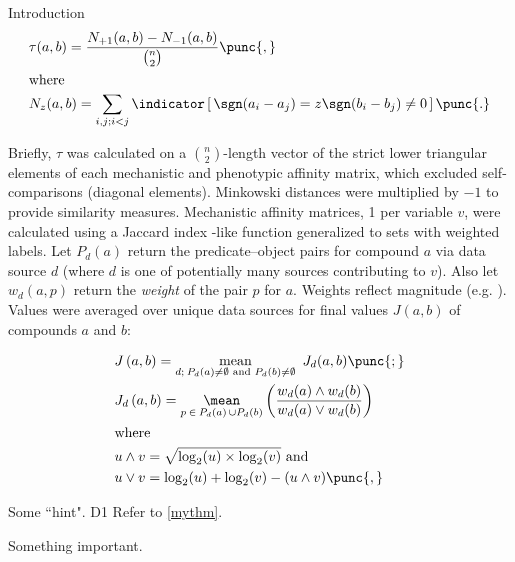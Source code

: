 \begin{MainChapter}{Introduction}
\begin{align}
    & \tau(a, b) = \frac{ N_{+1}(a,b) - N_{-1}(a,b)}{\textstyle \binom{n}{2}}
    \label{eqn:kappa}\punc{,}\\
    \shortintertext{where}
    & N_z(a,b) = \sum_{i,j;i<j}\indicator \left[ \, \sgn(a_i - a_j) = z \sgn(b_i - b_j) \neq 0 \, \right]
    \punc{.}
\end{align}

Briefly, $\tau$ was calculated on a $\binom{n}{2}$-length vector of the strict lower triangular elements of each mechanistic and phenotypic affinity matrix, which excluded self-comparisons (diagonal elements).
Minkowski distances were multiplied by $-1$ to provide similarity measures. Mechanistic affinity matrices, 1 per variable $v$, were calculated using a Jaccard index -like function generalized to sets with weighted labels.
Let $P_d(a)$ return the predicate--object pairs for compound $a$ via data source $d$ (where $d$ is one of potentially many sources contributing to $v$). Also let $w_d(a, p)$ return the \emph{weight} of the pair $p$ for $a$. Weights reflect magnitude (e.g. ).
Values were averaged over unique data sources for final values ${J}(a, b)$ of compounds $a$ and $b$:

\begin{align}
    &
    {J} \left( a, b \right) =
    \underset{
        d ; \: P_d(a) \neq \emptyset
        \text{ and } P_d(b) \neq \emptyset
    }{\text{mean}}
    \ \, {J}_d (a, b)  \punc{;} \\
    &
    {J}_d \left(a, b \right) =
    \underset{p \: \in \: P_d(a) \, \cup P_d(b)}{\mean}
    \left(
    \frac{
         w_d(a) \wedge w_d(b)
    }{
        w_d(a) \vee w_d(b)
    }
    \right)\\
    \shortintertext{where}
    &
    u \wedge v = \sqrt{ \log_2(u) \times \log_2(v) } \text{ and}   \\
    &
    u \vee v = \log_2(u) + \log_2(v) - (u \wedge v)
    \punc{,}
\end{align}


\begin{Hint}[name = An optional title., label=myhint]
Some ``hint". \ac{D1}
Refer to \cref{mythm}.
\end{Hint}

\begin{Important}[name=Watch out]
Something important.
\end{Important}



\end{MainChapter}
